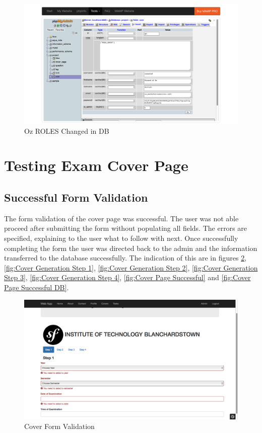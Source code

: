 \begin{figure}[htbp]
   \centering
   \includegraphics[width=400pt]{figures/oz_making_admin_db.png} %
   \caption{Oz ROLES Changed in DB}
   \label{fig:Oz ROLES Changed in DB}
\end{figure}


\section{Testing Exam Cover Page}

\subsection{Successful Form Validation}

The form validation of the cover page was successful. The user was not able proceed after submitting the form without populating all fields. The errors are specified, explaining to the user what to follow with next. Once successfully completing the form the user was directed back to the admin and the information transferred to the database successfully. The indication of this are in figures \ref{fig:Cover Form Validation}, \ref{fig:Cover Generation Step 1}, \ref{fig:Cover Generation Step 2}, \ref{fig:Cover Generation Step 3}, \ref{fig:Cover Generation Step 4}, \ref{fig:Cover Page Successful} and \ref{fig:Cover Page Successful DB}.

\begin{figure}[htbp]
   \centering
   \includegraphics[width=400pt]{figures/covers_test.png} %
   \caption{Cover Form Validation}
   \label{fig:Cover Form Validation}
\end{figure}

